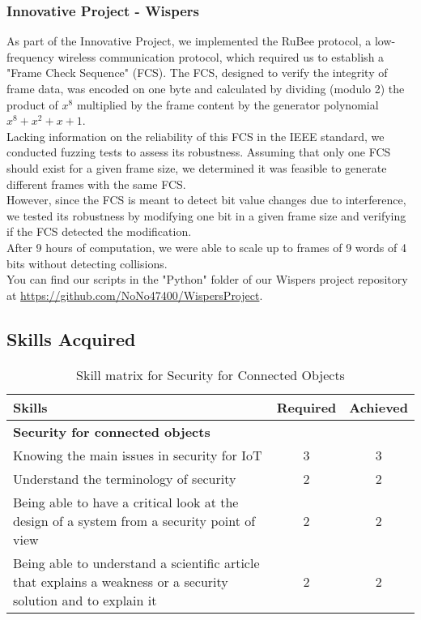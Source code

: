 \subsubsection{Innovative Project - Wispers}
\indent \indent As part of the Innovative Project, we implemented the RuBee protocol, a low-frequency wireless communication protocol, which required us to establish a "Frame Check Sequence" (FCS). The FCS, designed to verify the integrity of frame data, was encoded on one byte and calculated by dividing (modulo 2) the product of \(x^8\) multiplied by the frame content by the generator polynomial \(x^8 + x^2 + x + 1\).\\
Lacking information on the reliability of this FCS in the IEEE standard, we conducted fuzzing tests to assess its robustness. Assuming that only one FCS should exist for a given frame size, we determined it was feasible to generate different frames with the same FCS.\\
However, since the FCS is meant to detect bit value changes due to interference, we tested its robustness by modifying one bit in a given frame size and verifying if the FCS detected the modification.\\
After 9 hours of computation, we were able to scale up to frames of 9 words of 4 bits without detecting collisions.\\ You can find our scripts in the "Python" folder of our Wispers project repository at \url{https://github.com/NoNo47400/WispersProject}.\\

\subsection{Skills Acquired}
\begin{table}[H]
    \centering
    \renewcommand{\arraystretch}{1.5} %
    \begin{tabular}{|p{11cm}|c|c|}
    \hline
    \rowcolor[gray]{0.8}
    \textbf{Skills} & \textbf{Required} & \textbf{Achieved} \\ \hline
    \rowcolor[gray]{0.9} \textbf{Security for connected objects} &  &  \\ \hline
    Knowing the main issues in security for IoT & 3 & 3 \\ \hline
    Understand the terminology of security & 2 & 2 \\ \hline
    Being able to have a critical look at the design of a system from a security point of view & 2 & 2 \\ \hline
    Being able to understand a scientific article that explains a weakness or a security solution and to explain it & 2 & 2 \\ \hline
    \end{tabular}
    \caption{Skill matrix for Security for Connected Objects}
    \label{table:skills-security-iot}
\end{table}

